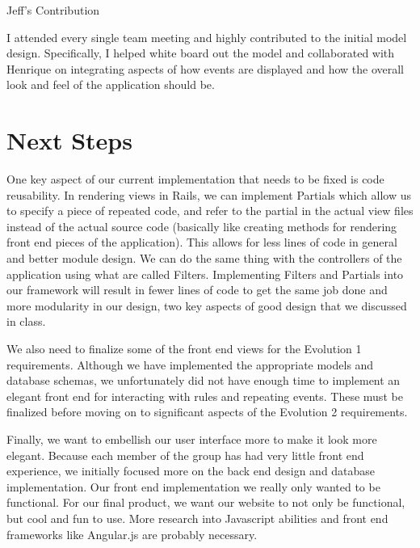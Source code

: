 \documentclass[11pt]{article}
\begin{document}
Jeff's Contribution

I attended every single team meeting and highly contributed to the initial model design.  Specifically, I helped white board out the model and collaborated with Henrique on integrating aspects of how events are displayed and how the overall look and feel of the application should be.

\section{Next Steps}

One key aspect of our current implementation that needs to be fixed is code reusability.  In rendering views in Rails, we can implement Partials which allow us to specify a piece of repeated code, and refer to the partial in the actual view files instead of the actual source code (basically like creating methods for rendering front end pieces of the application).  This allows for less lines of code in general and better module design.  We can do the same thing with the controllers of the application using what are called Filters.  Implementing Filters and Partials into our framework will result in fewer lines of code to get the same job done and more modularity in our design, two key aspects of good design that we discussed in class.

We also need to finalize some of the front end views for the Evolution 1 requirements.  Although we have implemented the appropriate models and database schemas, we unfortunately did not have enough time to implement an elegant front end for interacting with rules and repeating events.  These must be finalized before moving on to significant aspects of the Evolution 2 requirements.

Finally, we want to embellish our user interface more to make it look more elegant.  Because each member of the group has had very little front end experience, we initially focused more on the back end design and database implementation.  Our front end implementation we really only wanted to be functional.  For our final product, we want our website to not only be functional, but cool and fun to use.  More research into Javascript abilities and front end frameworks like Angular.js are probably necessary.
\end{document}
